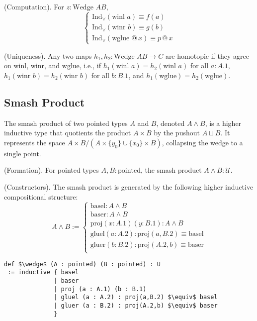 \begin{theorem} (Computation).
For \( z : \text{Wedge } A B \),
\[
\begin{cases}
\text{Ind}_\vee(\text{winl } a) \equiv f(a) \\
\text{Ind}_\vee(\text{winr } b) \equiv g(b) \\
\text{Ind}_\vee(\text{wglue } @ \, x) \equiv p \, @ \, x
\end{cases}
\]
\end{theorem}

\begin{theorem} (Uniqueness).
Any two maps \( h_1, h_2 : \text{Wedge } A B \to C \) are homotopic if
they agree on \( \text{winl} \), \( \text{winr} \), and \( \text{wglue} \),
i.e., if \( h_1(\text{winl } a) = h_2(\text{winl } a) \) for
all \( a : A.1 \), \( h_1(\text{winr } b) = h_2(\text{winr } b) \) for
all \( b : B.1 \), and \( h_1(\text{wglue}) = h_2(\text{wglue}) \).
\end{theorem}

\newpage
\subsection{Smash Product}
The smash product of two pointed types \( A \) and \( B \), denoted \( A \wedge B \),
is a higher inductive type that quotients the product \( A \times B \) by
the pushout \( A \sqcup B \). It represents the space \( A \times B / (A \times \{ y_0 \} \cup \{ x_0 \} \times B) \),
collapsing the wedge to a single point.

\begin{definition} (Formation).
For pointed types \( A, B : \text{pointed} \), the smash product \( A \wedge B : \mathcal{U} \).
\end{definition}

\begin{definition} (Constructors).
The smash product is generated by the following higher inductive compositional structure:
\[
A \wedge B :=
\begin{cases}
\text{basel} : A \wedge B \\
\text{baser} : A \wedge B \\
\text{proj} (x: A.1) (y: B.1) : A \wedge B \\
\text{gluel} (a: A.2) : \text{proj}(a,B.2) \equiv \text{basel} \\
\text{gluer} (b: B.2) : \text{proj}(A.2,b) \equiv \text{baser} \\
\end{cases}
\]
\begin{lstlisting}[mathescape=true]
def $\wedge$ (A : pointed) (B : pointed) : U
 := inductive { basel
              | baser
              | proj (a : A.1) (b : B.1)
              | gluel (a : A.2) : proj(a,B.2) $\equiv$ basel
              | gluer (a : B.2) : proj(A.2,b) $\equiv$ baser
              }
\end{lstlisting}
\end{definition}

